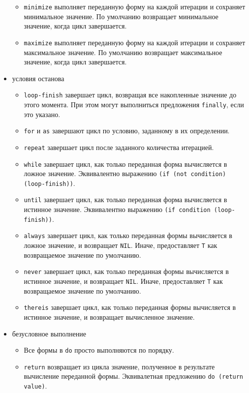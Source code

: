 \begin{itemize}
\begin{itemize}
      \item \lstinline{minimize} выполняет переданную форму на каждой итерации и сохраняет минимальное значение. По умолчанию возвращает минимальное значение, когда цикл завершается.
      \item \lstinline{maximize} выполняет переданную форму на каждой итерации и сохраняет максимальное значение. По умолчанию возвращает максимальное значение, когда цикл завершается.
    \end{itemize}
  \item условия останова
    \begin{itemize}
      \item \lstinline{loop-finish} завершает цикл, возвращая все накопленные значение до этого момента. При этом могут выполниться предложения \lstinline{finally}, если это указано.
      \item \lstinline{for} и \lstinline{as} завершают цикл по условию, заданному в их определении.
      \item \lstinline{repeat} завершает цикл после заданного количества итерацией.
      \item \lstinline{while} завершает цикл, как только переданная форма вычисляется в ложное значение. Эквивалентно выражению \lstinline{(if (not condition) (loop-finish))}.
      \item \lstinline{until} завершает цикл, как только переданная форма вычисляется в истинное значение. Эквивалентно выражению \lstinline{(if condition (loop-finish))}.
      \item \lstinline{always} завершает цикл, как только переданная формы вычисляется в ложное значение, и возвращает \lstinline{NIL}. Иначе, предоставляет \lstinline{T} как возвращаемое значение по умолчанию.
      \item \lstinline{never} завершает цикл, как только переданная формы вычисляется в истинное значение, и возвращает \lstinline{NIL}. Иначе, предоставляет \lstinline{T} как возвращаемое значение по умолчанию.
      \item \lstinline{thereis} завершает цикл, как только переданная формы вычисляется в истинное значение, и возвращает вычисленное значение.
    \end{itemize}
  \item безусловное выполнение
    \begin{itemize}
      \item Все формы в \lstinline{do} просто выполняются по порядку.
      \item \lstinline{return} возвращает из цикла значение, полученное в результате вычисление переданной формы. Эквивалетная предложению \lstinline{do (return value)}.

\end{itemize}
\end{itemize}

